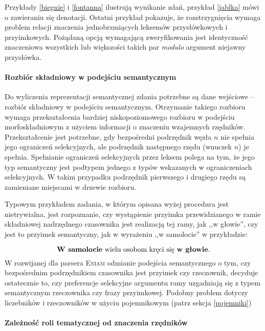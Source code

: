 \documentclass[12pt]{mwart}
\theoremstyle{remark}
\newcommand{\eniam}{\textsc{Eniam}}
\begin{document}
Przykłady \ref{biegnie} i \ref{fontanna} ilustrują wynikanie zdań, przykład \ref{jablka} mówi o zawieraniu się denotacji.
Ostatni przykład pokazuje, że rozstrzygnięcia wymaga problem relacji znaczenia jednobrzmiących leksemów przysłówkowych i przyimkowych. Pożądaną opcją wymagającą zweryfikowania jest identyczność znaczeniowa wszystkich lub większości takich par \emph{modulo} argument niejawny przysłówka.

\paragraph{Rozbiór składniowy w podejściu semantycznym}

Do wyliczenia reprezentacji semantycznej zdania potrzebne są dane wejściowe -- rozbiór składniowy w podejściu semantycznym. Otrzymanie takiego rozbioru wymaga przekształcenia bardziej niskopoziomowego rozbioru w podejściu morfoskładniowym z użyciem informacji o znaczeniu wzajemnych rzędników. Przekształcenie jest potrzebne, gdy bezpośredni podrzędnik węzła $n$ nie spełnia jego ograniczeń selekcyjnych, ale podrzędnik następnego rzędu (wnuczek $n$) je spełnia. Spełnianie ograniczeń selekcyjnych przez leksem polega na tym, że jego typ semantyczny jest podtypem jednego z typów wskazanych w ograniczeniach selekcyjnych. W takim przypadku podrzędnik pierwszego i drugiego rzędu są zamieniane miejscami w drzewie rozbioru.

Typowym przykładem zadania, w którym opisana wyżej procedura jest nietrywialna, jest rozpoznanie, czy wystąpienie przyimka przewidzianego w ramie składniowej nadrzędnego czasownika jest realizacją tej ramy, jak ,,w głowie'', czy jest to przyimek semantyczny, jak w wyrażeniu ,,w samolocie'' w przykładzie:

\begin{equation}
	\text{\textbf{W samolocie} wielu osobom kręci się \textbf{w głowie}.}
\end{equation}
W rozwijanej dla parsera \eniam{} odmianie podejścia semantycznego
o tym, czy bezpośrednim podrzędnikiem czasownika jest przyimek czy rzeczownik,
decyduje ostatecznie to, czy preferencje selekcyjne argumentu ramy uzgadniają się z typem semantycznym rzeczownika czy frazy przyimkowej.
Podobny problem dotyczy liczebników i rzeczowników w użyciu pojemnikowym (patrz sekcja \ref{pojemniki})

\paragraph{Zależność roli tematycznej od znaczenia rzędników}
\end{document}
